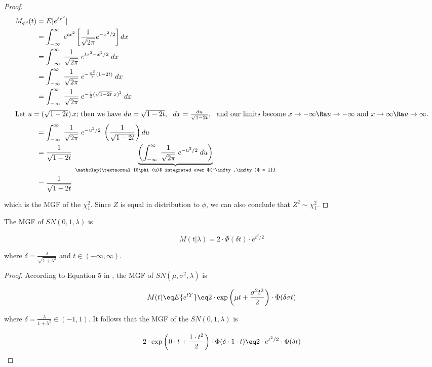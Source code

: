 \documentclass{article}
\begin{document}
\begin{proof}
  \begin{align*}
    M_{\phi^2}(t) &= E[e^{tx^2}] \\
    &= \int_{-\infty}^\infty \; e^{tx^2} \left[ \frac{1}{\sqrt{2\pi}} e^{-x^2/2} \right] dx \\
    &= \int_{-\infty}^\infty \; \frac{1}{\sqrt{2\pi}} \; e^{tx^2 - x^2/2} \; dx \\
    &= \int_{-\infty}^\infty \; \frac{1}{\sqrt{2\pi}} \; e^{-\frac{x^2}{2}(1 - 2t)} \; dx \\
    &= \int_{-\infty}^\infty \; \frac{1}{\sqrt{2\pi}} \; e^{-\frac{1}{2}(\sqrt{1-2t} \; x)^2} \; dx \\
    \intertext{Let $u = (\sqrt{1-2t}) \, x$; then we have $du = \sqrt{1-2t}$, \enspace $dx = \frac{du}{\sqrt{1-2t}}$, \enspace and our limits become $x \to -\infty \Ra u \to -\infty$
      and $x \to \infty \Ra u \to \infty$.}
    &= \int_{-\infty}^\infty \; \frac{1}{\sqrt{2\pi}} \; e^{-u^2/2} \; \left( \frac{1}{\sqrt{1-2t}} \right) du \\
    &= \frac{1}{\sqrt{1-2t}} \; \underbrace{\left( \int_{-\infty}^\infty \; \frac{1}{\sqrt{2\pi}} \; e^{-u^2/2} \; du \right)}_{\mathclap{\textnormal{$\phi(u)$ integrated over
      $(-\infty,\infty)$ = 1}}} \label{phi-pdf} \\
    &= \frac{1}{\sqrt{1-2t}}
  \end{align*}

  which is the MGF of the $\chi^2_1$. Since $Z$ is equal in distribution to
  $\phi$, we can also conclude that $Z^2 \sim \chi^2_1$. \end{proof}

\begin{property} \label{prop:4}
  The MGF of $SN(0,1,\lambda)$ is

  \begin{equation} \label{eq:p4-sn-mgf}
    M(t|\lambda) = 2 \cdot \Phi (\delta t) \cdot e^{t^2/2}
  \end{equation}
    
  where $\delta = \frac{\lambda}{\sqrt{1 + \lambda^2}}$ and $t \in (-\infty, \infty)$.
\end{property}

\begin{proof}
  According to Equation 5 in \citet{azzalini}, the MGF of $SN(\mu, \sigma^2,
  \lambda)$ is

  \begin{equation*}
    M(t) \eq E\{e^{tY}\} \eq 2 \cdot \exp \left( \mu t + \frac{\sigma^2 t^2}{2} \right) \cdot \Phi(\delta \sigma t)
  \end{equation*}

  where $\delta = \frac{\lambda}{1 + \lambda^2} \in (-1, 1)$. It follows that
  the MGF of the $SN(0, 1, \lambda)$ is

  \begin{equation*}
    2 \cdot \exp \left( 0 \cdot t + \frac{1 \cdot t^2}{2} \right) \cdot \Phi(\delta \cdot 1 \cdot t) \eq 2 \cdot e^{t^2/2} \cdot \Phi(\delta t)
  \end{equation*}
\end{proof}
\end{document}
